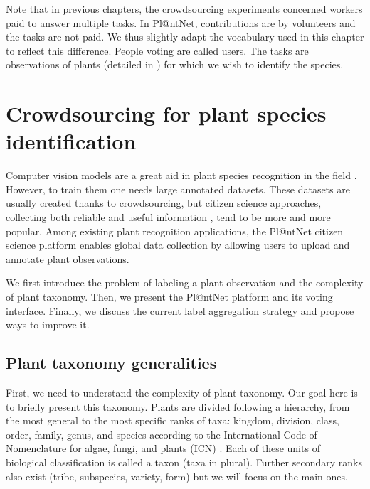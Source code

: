 Note that in previous chapters, the crowdsourcing experiments concerned workers paid to answer multiple tasks.
In Pl@ntNet, contributions are by volunteers and the tasks are not paid.
We thus slightly adapt the vocabulary used in this chapter to reflect this difference.
People voting are called users.
The tasks are observations of plants (detailed in ) for which we wish to identify the species.

\section{Crowdsourcing for plant species identification}
\label{sec:introducing_plantnet}

Computer vision models are a great aid in plant species recognition in the field \citep{vidal2021perspectives,borowiec2022}.
However, to train them one needs large annotated datasets.
These datasets are usually created thanks to crowdsourcing, but  citizen science approaches, collecting both reliable and useful information \citep{brown2019potential,wright2021pixelwise}, tend to be more and more popular.
Among existing plant recognition applications, the Pl@ntNet citizen science platform \citep{affouard2017pl} enables global data collection by allowing users to upload and annotate plant observations.

We first introduce the problem of labeling a plant observation and the complexity of plant taxonomy.
Then, we present the Pl@ntNet platform and its voting interface.
Finally, we discuss the current label aggregation strategy and propose ways to improve it.

\subsection{Plant taxonomy generalities}
First, we need to understand the complexity of plant taxonomy.
Our goal here is to briefly present this taxonomy.
Plants are divided following a hierarchy, from the most general to the most specific ranks of taxa: kingdom, division, class, order, family, genus, and species according to the International Code of Nomenclature for algae, fungi, and plants (ICN) \citep{turland2018international}.
Each of these units of biological classification is called a taxon (taxa in plural).
Further secondary ranks also exist (tribe, subspecies, variety, form) but we will focus on the main ones.

